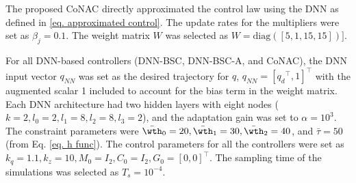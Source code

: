 \documentclass[lettersize,journal]{IEEEtran}
\begin{document}
The proposed CoNAC directly approximated the control law using the DNN as defined in \eqref{eq. approximated control}. The update rates for the multipliers were set as $\beta_{j}=0.1$. The weight matrix $W$ was selected as $W=\text{diag}([5,1,15,15])]$.

For all DNN-based controllers (DNN-BSC, DNN-BSC-A, and CoNAC), the DNN input vector $q_{NN}$ was set as the desired trajectory for ${q}$, \ie $q_{NN}=[{q_d}^\top,1]^\top$ with the augmented scalar 1 included to account for the bias term in the weight matrix. 
Each DNN architecture had two hidden layers with eight nodes (\ie $k=2, l_0=2, l_1=8, l_2=8, l_3=2$), and the adaptation gain was set to $\alpha =10^3$. The constraint parameters were $\bar\wth_0=20, \bar\wth_1=30, \bar\wth_2=40$, and $\bar\tau = 50$ (from Eq. \eqref{eq. h func}). The control parameters for all the controllers were set as ${k_q}=1.1,{k_z}=10,M_0=I_2,C_0=I_2,G_0=[0,0]^\top$.
The sampling time of the simulations was selected as $T_s=10^{-4}$.
\end{document}
